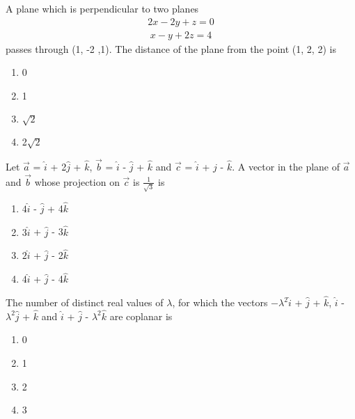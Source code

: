 \item A plane which is perpendicular to two planes 
\begin{align}
2x - 2y + z = 0
\end{align}
\begin{align}
x - y + 2z = 4
\end{align}
passes through (1, -2 ,1). The distance of the plane from the point (1, 2, 2) is
\begin{enumerate}
\item 0
\item 1
\item $\sqrt{2}$
\item 2$\sqrt{2}$
\end{enumerate}

\item Let $\overrightarrow{a}$ = $\hat{i}$ + 2$\hat{j}$ + $\hat{k}$, $\overrightarrow{b}$ = $\hat{i}$ - $\hat{j}$ + $\hat{k}$ and $\overrightarrow{c}$ = $\hat{i}$ + $\hat{j}$ - $\hat{k}$. A vector in the plane of $\overrightarrow{a}$ and $\overrightarrow{b}$ whose projection on $\overrightarrow{c}$ is $\frac{1}{\sqrt{3}}$ is
\begin{enumerate}
\item $4\hat{i}$ - $\hat{j}$ + 4$\hat{k}$
\item $3\hat{i}$ + $\hat{j}$ - 3$\hat{k}$
\item $2\hat{i}$ + $\hat{j}$ - 2$\hat{k}$
\item $4\hat{i}$ + $\hat{j}$ - 4$\hat{k}$
\end{enumerate}

\item The number of distinct real values of $\lambda$, for which the vectors $-\lambda^{2}\hat{i}$ + $\hat{j}$ + $\hat{k}$, $\hat{i}$ - $\lambda^{2}\hat{j}$ + $\hat{k}$ and $\hat{i}$ + $\hat{j}$ - $\lambda^{2}\hat{k}$ are coplanar is
\begin{enumerate}
\item 0
\item 1
\item 2
\item 3
\end{enumerate}

